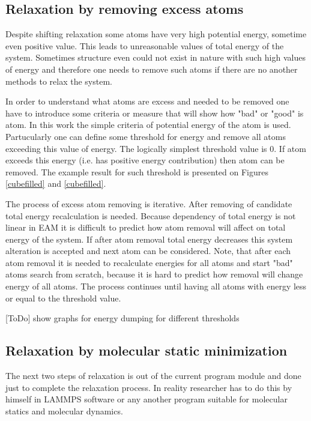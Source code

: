 \documentclass[12pt]{report}
\begin{document}
\subsection{Relaxation by removing excess atoms}

Despite shifting relaxation some atoms have very high potential energy, sometime even positive value. This leads to unreasonable values of total energy of the system. Sometimes structure even could not exist in nature with such high values of energy and therefore one needs to remove such atoms if there are no another methods to relax the system.

In order to understand what atoms are excess and needed to be removed one have to introduce some criteria or measure that will show how "bad" or "good" is atom. In this work the simple criteria of potential energy of the atom is used. Partucularly one can define some threshold for energy and remove all atoms exceeding this value of energy. The logically simplest threshold value is 0. If atom exceeds this energy (i.e. has positive energy contribution) then atom can be removed. The example result for such threshold is presented on Figures \ref{cubefilled} and \ref{cubefilled}.

The process of excess atom removing is iterative. After removing of candidate total energy recalculation is needed. Because dependency of total energy is not linear in EAM it is difficult to predict how atom removal will affect on total energy of the system. If after atom removal total energy decreases this system alteration is accepted and next atom can be considered. Note, that after each atom removal it is needed to recalculate energies for all atoms and start "bad" atoms search from scratch, because it is hard to predict how removal will change energy of all atoms. The process continues until having all atoms with energy less or equal to the threshold value.


[ToDo] show graphs for energy dumping for different thresholds

\subsection{Relaxation by molecular static minimization}

The next two steps of relaxation is out of the current program module and done just to complete the relaxation process. In reality researcher has to do this by himself in LAMMPS software or any another program suitable for molecular statics and molecular dynamics.
\end{document}
